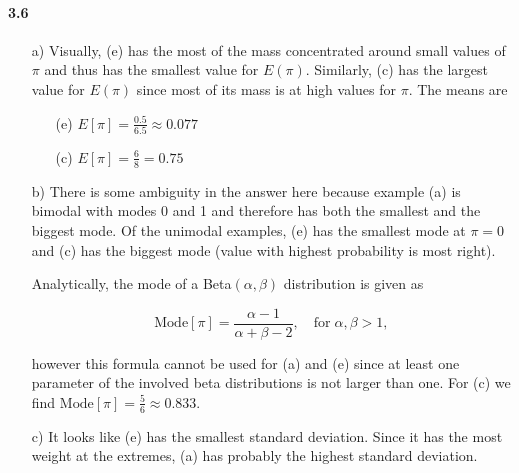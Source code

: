 \documentclass[fontsize=11pt,DIV=18,parskip=half]{scrartcl}
\begin{document}
\paragraph{3.6}
\begin{enumerate}
\item[a)] Visually, (e) has the most of the mass concentrated around small values of $\pi$ and thus has the smallest value for $E(\pi)$. Similarly, (c) has the largest value for $E(\pi)$ since most of its mass is at high values for $\pi$. The means are

	\begin{enumerate}
		\item[(e)] $E[\pi] = \frac{0.5}{6.5} \approx 0.077$
    	\item[(c)] $E[\pi] = \frac{6}{8} = 0.75$
	\end{enumerate}
	
\item[b)] There is some ambiguity in the answer here because example (a) is bimodal with modes 0 and 1 and therefore has both the smallest and the biggest mode. Of the unimodal examples, (e) has the smallest mode at $\pi=0$ and (c) has the biggest mode (value with highest probability is most right).

Analytically, the mode of a Beta$(\alpha, \beta)$ distribution is given as

\begin{equation*}
\text{Mode}[\pi] = \frac{\alpha - 1}{\alpha + \beta - 2}, \quad \text{for} \; \alpha,\beta>1,
\end{equation*}

however this formula cannot be used for (a) and (e) since at least one parameter of the involved beta distributions is not larger than one. For (c) we find $\text{Mode}[\pi] = \frac{5}{6} \approx 0.833$.

\item[c)] It looks like (e) has the smallest standard deviation. Since it has the most weight at the extremes, (a) has probably the highest standard deviation.
\end{enumerate}
\end{document}
